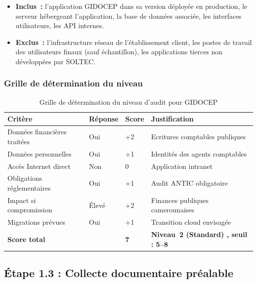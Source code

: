 \documentclass[12pt,a4paper,oneside]{report}
\begin{document}
\begin{itemize}[label={\color{gold}}, leftmargin=*, itemsep=2pt]
\item \textbf{Inclus~:} l'application GIDOCEP dans sa version d\'eploy\'ee en
  production, le serveur h\'ebergeant l'application, la base de donn\'ees
  associ\'ee, les interfaces utilisateurs, les API internes.
\item \textbf{Exclus~:} l'infrastructure r\'eseau de l'\'etablissement client,
  les postes de travail des utilisateurs finaux (sauf \'echantillon),
  les applications tierces non d\'evelopp\'ees par SOLTEC.
\end{itemize}

\subsubsection{Grille de d\'etermination du niveau}

\begin{table}[H]
\centering\small
\caption{Grille de d\'etermination du niveau d'audit pour GIDOCEP}
\label{tab:niveau_gidocep}
\begin{tabularx}{\textwidth}{p{5cm}p{2cm}p{2cm}X}
\toprule
\rowcolor{theadcolor}
\color{white}\textbf{Crit\`ere} &
\color{white}\textbf{R\'eponse} &
\color{white}\textbf{Score} &
\color{white}\textbf{Justification} \\
\midrule
Donn\'ees financi\`eres trait\'ees & Oui & +2 & Ecritures comptables publiques \\
Donn\'ees personnelles & Oui & +1 & Identit\'es des agents comptables \\
Acc\`es Internet direct & Non & 0 & Application intranet \\
Obligations r\'eglementaires & Oui & +1 & Audit ANTIC obligatoire \\
Impact si compromission & \'Elev\'e & +2 & Finances publiques camerounaises \\
Migrations pr\'evues & Oui & +1 & Transition cloud envisag\'ee \\
\midrule
\textbf{Score total} & & \textbf{7} & \textbf{Niveau~2 (Standard) , seuil : 5--8} \\
\bottomrule
\end{tabularx}
\end{table}

\subsection{\'Etape 1.3 : Collecte documentaire pr\'ealable}
\end{document}
